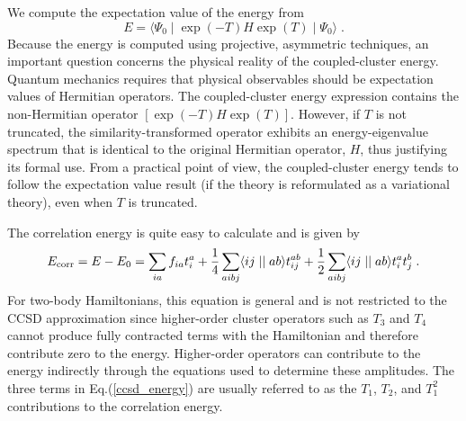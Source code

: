 We compute the expectation value of the energy from 
\begin{equation}
E=\langle\Psi_0\mid \exp\left(-T\right) H \exp\left(T\right)
\mid\Psi_0\rangle\;. 
\end{equation}
Because the energy is computed using projective, asymmetric techniques,
an important question concerns the physical reality of the coupled-cluster
energy. Quantum mechanics requires that physical observables should be
expectation values of Hermitian operators. The coupled-cluster energy
expression contains the non-Hermitian operator $\left[\exp(-T)H\exp(T)\right]$. 
However, if $T$ is not truncated, the similarity-transformed operator
exhibits an energy-eigenvalue spectrum that is identical to the original
Hermitian operator, $H$, thus justifying its formal use. 
From a practical point of view, the coupled-cluster energy tends to
follow the expectation value result (if the theory is reformulated as 
a variational theory), even when $T$ is truncated. 

The correlation energy is quite easy to calculate and is given by
\begin{equation}
E_{\rm corr}=E-E_0 = \sum_{ia}f_{ia}t^a_i
+\frac{1}{4}\sum_{aibj}\langle ij \mid\mid ab \rangle t^{ab}_{ij}
+\frac{1}{2}\sum_{aibj}\langle ij \mid\mid ab \rangle t^a_i t^b_j \;.
\label{ccsd_energy}
\end{equation}
For two-body Hamiltonians, this equation is general and is not 
restricted to the CCSD approximation since higher-order cluster
operators such as $T_3$ and $T_4$ cannot produce fully contracted
terms with the Hamiltonian and therefore contribute zero to the 
energy. Higher-order operators can contribute to the energy 
indirectly through the equations used to determine these 
amplitudes. The three terms in Eq.(\ref{ccsd_energy}) are 
usually referred to as the $T_1$, $T_2$, and $T_1^2$ contributions
to the correlation energy. 

